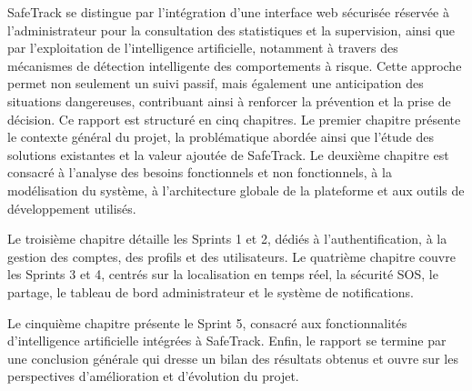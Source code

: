 SafeTrack se distingue par l'intégration d'une interface web sécurisée réservée à l'administrateur pour la consultation des statistiques et la supervision, ainsi que par l'exploitation de l'intelligence artificielle, notamment à travers des mécanismes de détection intelligente des comportements à risque. Cette approche permet non seulement un suivi passif, mais également une anticipation des situations dangereuses, contribuant ainsi à renforcer la prévention et la prise de décision.
Ce rapport est structuré en cinq chapitres. Le premier chapitre présente le contexte général du projet, la problématique abordée ainsi que l'étude des solutions existantes et la valeur ajoutée de SafeTrack. Le deuxième chapitre est consacré à l'analyse des besoins fonctionnels et non fonctionnels, à la modélisation du système, à l'architecture globale de la plateforme et aux outils de développement utilisés.

Le troisième chapitre détaille les Sprints 1 et 2, dédiés à l'authentification, à la gestion des comptes, des profils et des utilisateurs. Le quatrième chapitre couvre les Sprints 3 et 4, centrés sur la localisation en temps réel, la sécurité SOS, le partage, le tableau de bord administrateur et le système de notifications.

Le cinquième chapitre présente le Sprint 5, consacré aux fonctionnalités d'intelligence artificielle intégrées à SafeTrack. Enfin, le rapport se termine par une conclusion générale qui dresse un bilan des résultats obtenus et ouvre sur les perspectives d'amélioration et d'évolution du projet.




